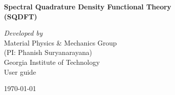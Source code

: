 \documentclass[12pt]{report}
\begin{document}

\begin{titlepage}
    \begin{center}
        \vspace*{1cm}
        
        \textbf{\LARGE Spectral Quadrature Density Functional Theory \\ \vspace{3mm} (SQDFT)} 
        \vspace{1.5cm}
                     
        \vspace{2.0cm}
        \emph{\large Developed by} \\
        \Large Material Physics \& Mechanics Group\\
        \Large (PI: Phanish Suryanarayana) \\
        \Large Georgia Institute of Technology\\
        \vspace{3.5cm}
        \Large User guide \\
\vspace{0.5cm}
              
    
        \vfill
\vspace{0.2cm}
        \large\today        %

    \end{center}
\end{titlepage}


\tableofcontents
\newpage
\end{document}
